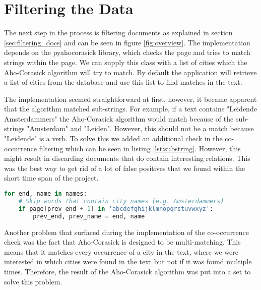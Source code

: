 \section{Filtering the Data}\label{sec:5-filtering}
The next step in the process is filtering documents as explained in section \ref{sec:filtering_docs} and can be seen in figure \ref{fig:overview}. The implementation depends on the pyahocorasick library, which checks the page and tries to match strings within the page. We can supply this class with a list of cities which the Aho-Corasick algorithm will try to match. By default the application will retrieve a list of cities from the database and use this list to find matches in the text.

The implementation seemed straightforward at first, however, it became apparent that the algorithm matched sub-strings. For example, if a text contains "Leidende Amsterdammers" the Aho-Corasick algorithm would match because of the sub-strings "Amsterdam" and "Leiden". However, this should not be a match because "Leidende" is a verb. To solve this we added an additional check in the co-occurrence filtering which can be seen in listing \ref{lst:substring}. However, this might result in discarding documents that do contain interesting relations. This was the best way to get rid of a lot of false positives that we found within the short time span of the project. 

\begin{lstlisting}[language=Python, caption=Additional check to prevent substring matches, label={lst:substring}]
for end, name in names:
    # Skip words that contain city names (e.g. Amsterdammers)
    if page[prev_end + 1] in 'abcdefghijklmnopqrstuvwxyz':
        prev_end, prev_name = end, name
\end{lstlisting}

Another problem that surfaced during the implementation of the co-occurrence check was the fact that Aho-Corasick is designed to be multi-matching. This means that it matches every occurrence of a city in the text, where we were interested in which cities were found in the text but not if it was found multiple times. Therefore, the result of the Aho-Corasick algorithm was put into a set to solve this problem.
